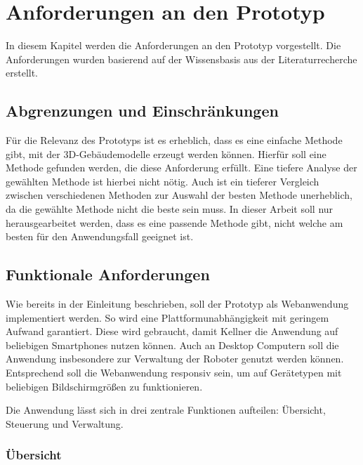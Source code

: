 \newpage
\section{Anforderungen an den Prototyp}
In diesem Kapitel werden die Anforderungen an den Prototyp vorgestellt. Die Anforderungen wurden basierend auf der Wissensbasis aus der Literaturrecherche erstellt.

\subsection{Abgrenzungen und Einschränkungen}

Für die Relevanz des Prototyps ist es erheblich, dass es eine einfache Methode gibt, mit der 3D-Gebäudemodelle erzeugt werden können. Hierfür soll eine Methode gefunden werden, die diese Anforderung erfüllt. Eine tiefere Analyse der gewählten Methode ist hierbei nicht nötig. Auch ist ein tieferer Vergleich zwischen verschiedenen Methoden zur Auswahl der besten Methode unerheblich, da die gewählte Methode nicht die beste sein muss. In dieser Arbeit soll nur herausgearbeitet werden, dass es eine passende Methode gibt, nicht welche am besten für den Anwendungsfall geeignet ist.

\subsection{Funktionale Anforderungen}

Wie bereits in der Einleitung beschrieben, soll der Prototyp als Webanwendung implementiert werden. So wird eine Plattformunabhängigkeit mit geringem Aufwand garantiert. Diese wird gebraucht, damit Kellner die Anwendung auf beliebigen Smartphones nutzen können. Auch an Desktop Computern soll die Anwendung insbesondere zur Verwaltung der Roboter genutzt werden können. Entsprechend soll die Webanwendung responsiv sein, um auf Gerätetypen mit beliebigen Bildschirmgrößen zu funktionieren.

Die Anwendung lässt sich in drei zentrale Funktionen aufteilen: Übersicht, Steuerung und Verwaltung.

\subsubsection{Übersicht}

